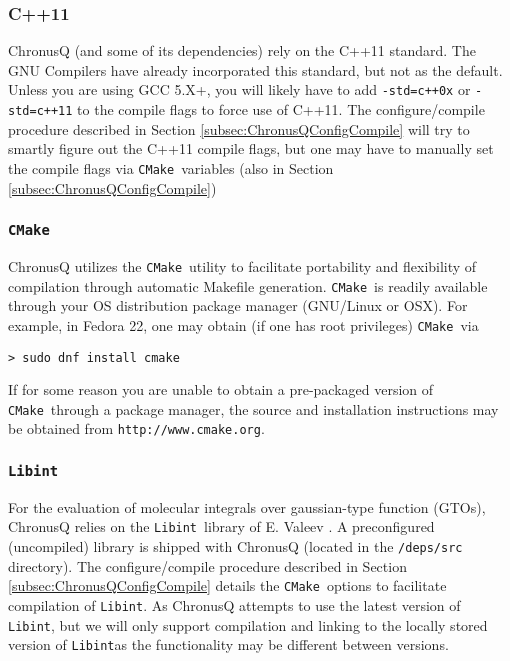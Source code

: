 \documentclass[12pt]{article}
\newcommand{\CMake}{\texttt{CMake}}
\newcommand{\Libint}{\texttt{Libint}}
\begin{document}
      \subsubsection{C++11} \label{subsubsec:C++11} 
        ChronusQ (and some of its dependencies) rely on the C++11 
        standard. The GNU Compilers have already incorporated this standard, but
	not as the default. Unless you are using GCC 5.X+, you will likely have
	to add \texttt{-std=c++0x} or \texttt{-std=c++11} to the compile flags
	to force use of C++11. The configure/compile procedure described in
	Section \ref{subsec:ChronusQConfigCompile} will try to smartly figure out
	the C++11 compile flags, but one may have to manually set the compile flags
	via \CMake~variables (also in Section \ref{subsec:ChronusQConfigCompile})

      \subsubsection{\CMake} \label{subsubsec:cmake} 
        ChronusQ utilizes the \CMake~utility to facilitate
        portability and flexibility of compilation through automatic Makefile 
	generation. \CMake~is readily available through your OS distribution
	package manager (GNU/Linux or OSX). For example, in Fedora 22, one may 
	obtain (if one has root privileges) \CMake~via

	\begin{lstlisting}
> sudo dnf install cmake
	\end{lstlisting}

	\noindent If for some reason you are unable to obtain a pre-packaged 
	version of \CMake~through a package manager, the source and installation 
	instructions may be obtained from \texttt{http://www.cmake.org}.

      \subsubsection{\Libint} \label{subsubsec:Libint}
        For the evaluation of molecular integrals over gaussian-type
        function (GTOs), ChronusQ relies on the \Libint~library of E. Valeev \cite{libint15}. A
	preconfigured (uncompiled) library is shipped with ChronusQ (located in
	the \texttt{/deps/src} directory). The configure/compile procedure
	described in Section \ref{subsec:ChronusQConfigCompile} details the
	\CMake~options to facilitate compilation of \Libint. As ChronusQ attempts
	to use the latest version of \Libint, but we will only support compilation
	and linking to the locally stored version of \Libint as the functionality
	may be different between versions.
\end{document}

